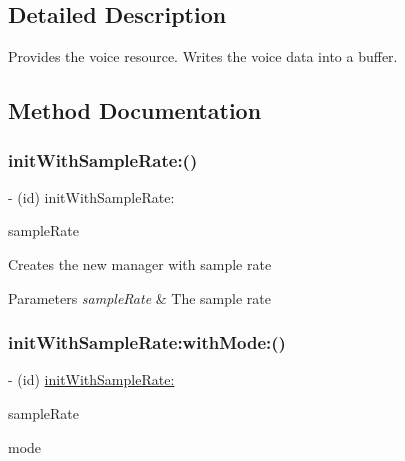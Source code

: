 \subsection{Detailed Description}
Provides the voice resource. Writes the voice data into a buffer. 

\subsection{Method Documentation}
\hypertarget{interface_o_p_c_s_capture_voice2_buffer_manager_ae6ccaffcb6da3c9abe3818cbf1219161}{}\label{interface_o_p_c_s_capture_voice2_buffer_manager_ae6ccaffcb6da3c9abe3818cbf1219161} 
\subsubsection{\texorpdfstring{init\+With\+Sample\+Rate\+:()}{initWithSampleRate:()}}
{\footnotesize\ttfamily -\/ (id) init\+With\+Sample\+Rate\+: \begin{DoxyParamCaption}\item[{(N\+S\+U\+Integer)}]{sample\+Rate }\end{DoxyParamCaption}}

Creates the new manager with sample rate 
\begin{DoxyParams}{Parameters}
{\em sample\+Rate} & The sample rate \\
\hline
\end{DoxyParams}
\hypertarget{interface_o_p_c_s_capture_voice2_buffer_manager_a048d81d787f96d5409c23a09fc8239ce}{}\label{interface_o_p_c_s_capture_voice2_buffer_manager_a048d81d787f96d5409c23a09fc8239ce} 
\subsubsection{\texorpdfstring{init\+With\+Sample\+Rate\+:with\+Mode\+:()}{initWithSampleRate:withMode:()}}
{\footnotesize\ttfamily -\/ (id) \hyperlink{interface_o_p_c_s_capture_voice2_buffer_manager_ae6ccaffcb6da3c9abe3818cbf1219161}{init\+With\+Sample\+Rate\+:} \begin{DoxyParamCaption}\item[{(N\+S\+U\+Integer)}]{sample\+Rate }\item[{withMode:(O\+P\+C\+S\+Capture\+Voice\+Mode)}]{mode }\end{DoxyParamCaption}}

